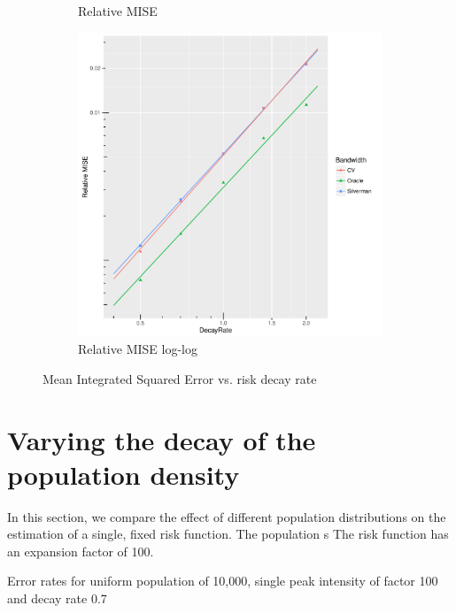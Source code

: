 \begin{figure}[htbp]
\begin{subfigure}[b]{0.3\textwidth}
    \caption{Relative MISE}
    \end{subfigure}
    \begin{subfigure}[b]{0.3\textwidth}
    \includegraphics[width=\textwidth]{results/by_cases_decay/RMISE-vs-risk-decay-log-log}
    \caption{Relative MISE log-log}
    \end{subfigure}
    \caption[MISE: by risk decay]{Mean Integrated Squared Error vs. risk decay rate}
    \label{fig:ise:unif_100_SD}
\end{figure}

\section{Varying the decay of the population density}
\label{sec:results:pSD_100_1h}

In this section, we compare the effect of different population distributions on the estimation of a single, fixed risk function.
The population s
The risk function has an expansion factor of 100.

\begin{table}[htbp]
\centering

\caption{Error rates for uniform population of 10,000, single peak intensity of factor 100 and decay rate 0.7}
\label{tbl:results:p0.7_100_1_1h}
\end{table}


